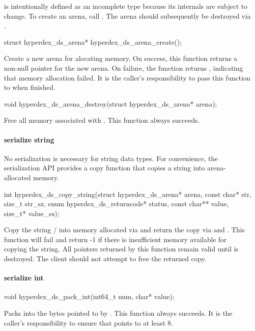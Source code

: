  is intentionally defined as an incomplete type
because its internals are subject to change.  To create an arena, call
.  The arena should subsequently be destroyed
via .

\begin{ccode}
struct hyperdex_ds_arena* hyperdex_ds_arena_create();
\end{ccode}
Create a new arena for alocating memory.  On success, this function
returns a non-null pointer for the new arena.  On failure, the function returns
, indicating that memory allocation failed.  It is the caller's
responsibility to pass this function to  when
finished.

\begin{ccode}
void hyperdex_ds_arena_destroy(struct hyperdex_ds_arena* arena);
\end{ccode}
Free all memory associated with .  This function always
succeeds.

\paragraph{serialize string}

No serialization is necessary for string data types.  For convenience, the
serialization API provides a copy function that copies a string into
arena-allocated memory.

\begin{ccode}
int hyperdex_ds_copy_string(struct hyperdex_ds_arena* arena, const char* str,
                            size_t str_sz, enum hyperdex_ds_returncode* status,
                            const char** value, size_t* value_sz);
\end{ccode}
Copy the string / into memory allocated via
 and return the copy via  and .  This
function will fail and return -1 if there is insufficient memory available for
copying the string.  All pointers returned by this function remain valid until
 is destroyed.  The client should not attempt to free the returned
copy.

\paragraph{serialize int}

\begin{ccode}
void hyperdex_ds_pack_int(int64_t num, char* value);
\end{ccode}
Packs  into the bytes pointed to by .  This
function always succeeds.  It is the caller's responsibility to ensure that
 points to at least \unit{8}{\byte}.

